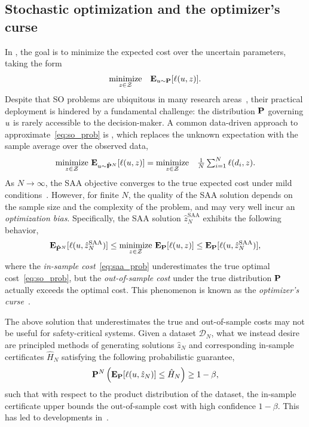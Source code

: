 \subsection{Stochastic optimization and the optimizer's curse}
\label{sec:so_def}
In , the goal is to minimize the expected cost over the uncertain parameters, taking the form
\begin{equation}
\label{eq:so_prob}
	\begin{array}{ll}
		\underset{z \in \mathcal{Z}}{\text{minimize}} & \mathbf{E}_{u \sim {\mathbf P}}[\ell(u,z)].
	\end{array}
\end{equation}
Despite that \gls{SO} problems are ubiquitous in many research areas~\citep{shapiro2021lectures}, their practical deployment is hindered by a fundamental challenge: the distribution ${\mathbf P}$ governing $u$ is rarely accessible to the decision-maker.
A common data-driven approach to approximate~\eqref{eq:so_prob} is , which replaces the unknown expectation with the sample average over the observed data,
\begin{equation}
\label{eq:saa_prob}
	\begin{array}{ll}
		\underset{z \in \mathcal{Z}}{\text{minimize}}  ~\mathbf{E}_{u \sim \hat{{\mathbf P}}^N}[\ell(u,z)] = \underset{z \in \mathcal{Z}}{\text{minimize}} & \frac{1}{N}\sum_{i=1}^N \ell(d_i, z).
	\end{array}
\end{equation}
As $N \to \infty$, the \gls{SAA} objective converges to the true expected cost under mild conditions~\citep{shapiro2021lectures}.
However, for finite $N$, the quality of the \gls{SAA} solution depends on the sample size and the complexity of the problem, and may very well incur an {\it optimization bias}. Specifically, the \gls{SAA} solution $\hat{z}^{\text{SAA}}_N$ exhibits the following behavior,
$$ \mathbf{E}_{\hat{{\mathbf P}}^N}[\ell(u,\hat{z}^{\text{SAA}}_N)]  \leq \underset{z \in \mathcal{Z}}{\text{minimize}}~\mathbf{E}_{{\mathbf P}}[\ell(u,z)] \leq \mathbf{E}_{{\mathbf P}}[\ell(u,\hat{z}^{\text{SAA}}_N)],$$
where the {\it in-sample cost}~\eqref{eq:saa_prob} underestimates the true optimal cost~\eqref{eq:so_prob}, but the {\it out-of-sample cost} under the true distribution ${\mathbf P}$ actually exceeds the optimal cost. This phenomenon is known as the {\it optimizer's curse}~\citep{kuhn2019wasserstein}. 

The above solution that underestimates the true and out-of-sample costs may not be useful for safety-critical systems. Given a dataset $\mathcal{D}_N$, what we instead desire are principled methods of generating solutions $\hat{z}_N$ and corresponding in-sample certificates $\hat{H}_N$ satisfying the following probabilistic guarantee,
\begin{equation}
	\label{eq:prob_guarantees_intro}
	{\mathbf P}^N\left( \mathbf{E}_{{\mathbf P}}[\ell(u, \hat{z}_N)] \le  \hat{H}_N \right) \ge 1 - \beta,
\end{equation}
such that with respect to the product distribution of the dataset, the in-sample certificate upper bounds the out-of-sample cost with high confidence $1-\beta$.
This has led to developments in~.

